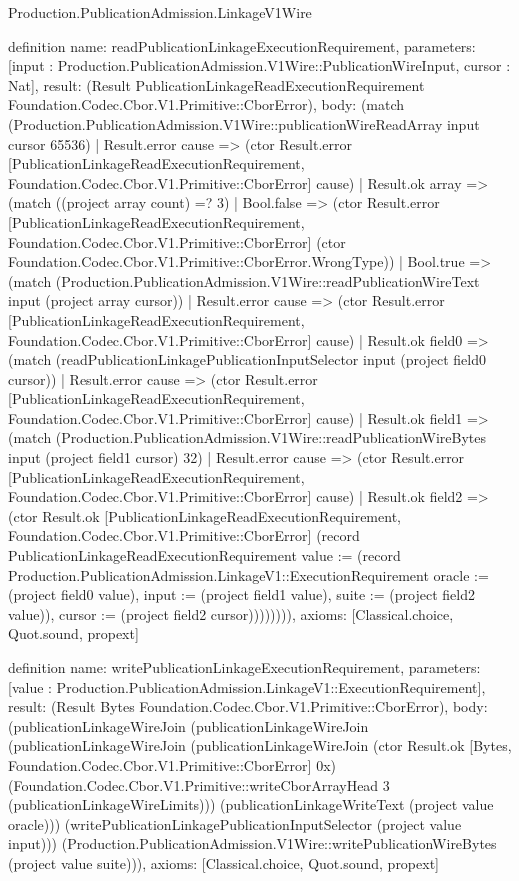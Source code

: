 \begin{lexlean}{Production.PublicationAdmission.LinkageV1Wire}
\begin{semanticmodule}
definition{
  name: readPublicationLinkageExecutionRequirement,
  parameters: [input : Production.PublicationAdmission.V1Wire::PublicationWireInput, cursor : Nat],
  result: (Result PublicationLinkageReadExecutionRequirement Foundation.Codec.Cbor.V1.Primitive::CborError),
  body: (match (Production.PublicationAdmission.V1Wire::publicationWireReadArray input cursor 65536)
    | Result.error cause => (ctor Result.error [PublicationLinkageReadExecutionRequirement, Foundation.Codec.Cbor.V1.Primitive::CborError] cause)
    | Result.ok array => (match ((project array count) =? 3)
      | Bool.false => (ctor Result.error [PublicationLinkageReadExecutionRequirement, Foundation.Codec.Cbor.V1.Primitive::CborError] (ctor Foundation.Codec.Cbor.V1.Primitive::CborError.WrongType))
      | Bool.true => (match (Production.PublicationAdmission.V1Wire::readPublicationWireText input (project array cursor))
        | Result.error cause => (ctor Result.error [PublicationLinkageReadExecutionRequirement, Foundation.Codec.Cbor.V1.Primitive::CborError] cause)
        | Result.ok field0 => (match (readPublicationLinkagePublicationInputSelector input (project field0 cursor))
          | Result.error cause => (ctor Result.error [PublicationLinkageReadExecutionRequirement, Foundation.Codec.Cbor.V1.Primitive::CborError] cause)
          | Result.ok field1 => (match (Production.PublicationAdmission.V1Wire::readPublicationWireBytes input (project field1 cursor) 32)
            | Result.error cause => (ctor Result.error [PublicationLinkageReadExecutionRequirement, Foundation.Codec.Cbor.V1.Primitive::CborError] cause)
            | Result.ok field2 => (ctor Result.ok [PublicationLinkageReadExecutionRequirement, Foundation.Codec.Cbor.V1.Primitive::CborError] (record PublicationLinkageReadExecutionRequirement {value := (record Production.PublicationAdmission.LinkageV1::ExecutionRequirement {oracle := (project field0 value), input := (project field1 value), suite := (project field2 value)}), cursor := (project field2 cursor)}))))))),
  axioms: [Classical.choice, Quot.sound, propext]
}

definition{
  name: writePublicationLinkageExecutionRequirement,
  parameters: [value : Production.PublicationAdmission.LinkageV1::ExecutionRequirement],
  result: (Result Bytes Foundation.Codec.Cbor.V1.Primitive::CborError),
  body: (publicationLinkageWireJoin (publicationLinkageWireJoin (publicationLinkageWireJoin (publicationLinkageWireJoin (ctor Result.ok [Bytes, Foundation.Codec.Cbor.V1.Primitive::CborError] 0x) (Foundation.Codec.Cbor.V1.Primitive::writeCborArrayHead 3 (publicationLinkageWireLimits))) (publicationLinkageWriteText (project value oracle))) (writePublicationLinkagePublicationInputSelector (project value input))) (Production.PublicationAdmission.V1Wire::writePublicationWireBytes (project value suite))),
  axioms: [Classical.choice, Quot.sound, propext]
}


\end{semanticmodule}
\end{lexlean}
